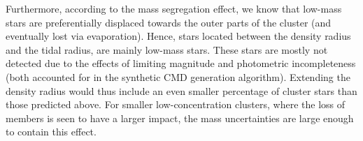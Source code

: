 \documentclass{article}
\begin{document}
Furthermore, according to the mass segregation effect, we know that low-mass
stars are preferentially displaced towards the outer parts of the cluster (and
eventually lost via evaporation). Hence, stars located between the
density radius and the tidal radius, are mainly low-mass stars.
%
%
%
%
These stars are mostly not detected due to the effects of limiting
magnitude and photometric incompleteness (both accounted for in the synthetic
CMD generation algorithm). Extending the density radius would thus
include an even smaller percentage of cluster stars than those predicted
above.
%
For smaller low-concentration clusters, where the loss of members is seen to
have a larger impact, the mass uncertainties are large enough to contain this
effect.\\

\end{document}
